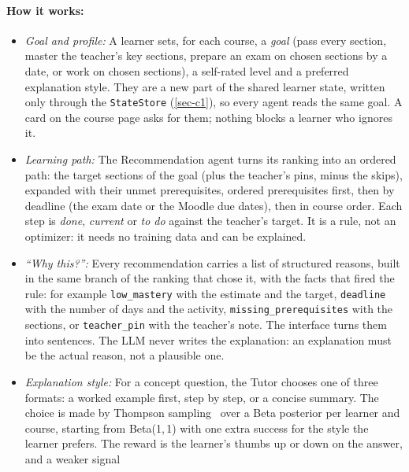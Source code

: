 \paragraph{How it works:}
\begin{itemize}
  \item \emph{Goal and profile:} A learner sets, for each course, a
        \emph{goal} (pass every section, master the teacher's key
        sections, prepare an exam on chosen sections by a date, or work on
        chosen sections), a self-rated level and a preferred explanation
        style. They are a new part of the shared learner state, written
        only through the \texttt{StateStore} (\cref{sec-c1}), so every
        agent reads the same goal. A card on the course page asks for them;
        nothing blocks a learner who ignores it.
  \item \emph{Learning path:} The Recommendation agent turns its ranking
        into an ordered path: the target sections of the goal (plus the
        teacher's pins, minus the skips), expanded with their unmet
        prerequisites, ordered prerequisites first, then by deadline (the
        exam date or the Moodle due dates), then in course order. Each step
        is \emph{done}, \emph{current} or \emph{to do} against the
        teacher's target. It is a rule, not an optimizer: it needs no
        training data and can be explained.
  \item \emph{``Why this?'':} Every recommendation carries a list of
        structured reasons, built in the same branch of the ranking that
        chose it, with the facts that fired the rule: for example
        \texttt{low\_mastery} with the estimate and the target,
        \texttt{deadline} with the number of days and the activity,
        \texttt{missing\_prerequisites} with the sections, or
        \texttt{teacher\_pin} with the teacher's note. The interface turns
        them into sentences. The LLM never writes the explanation: an
        explanation must be the actual reason, not a plausible one.
  \item \emph{Explanation style:} For a concept question, the Tutor
        chooses one of three formats: a worked example first, step by
        step, or a concise summary. The choice is made by Thompson
        sampling~\cite{thompson1933,russo2018ts} over a Beta posterior per
        learner and course, starting from Beta(1,\,1) with one extra
        success for the style the learner prefers. The reward is the
        learner's thumbs up or down on the answer, and a weaker signal

\end{itemize}
